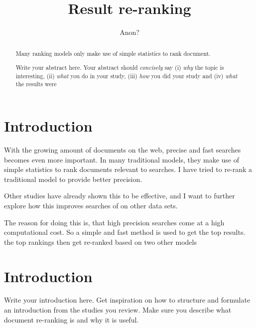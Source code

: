 \documentclass{sig-alternate}
\begin{document}
\title{Result re-ranking}
\author{
\alignauthor 
Anon? %
}
\maketitle

\begin{abstract}
Many ranking models only make use of simple statistics to rank document. 
\end{abstract}
\section{Introduction}
With the growing amount of documents on the web, precise and fast searches becomes even more important. In many traditional models, they make use of simple statistics to rank documents relevant to searches. I have tried to re-rank a traditional model to provide better precision.

Other studies\cite{woo2010achieving} have already shown this to be effective, and I want to further explore how this improves searches of on other data sets.

The reason for doing this is, that high precision searches come at a high computational cost. So a simple and fast method is used to get the top results. the top rankings then get re-ranked based on two other models














\begin{abstract}
Write your abstract here. Your abstract should \emph{concisely} say (i) \emph{why} the topic is interesting, (ii) \emph{what} you do in your study, (iii) \emph{how} you did your study and (iv) \emph{what} the results were
\end{abstract}

\section{Introduction}
Write your introduction here. Get inspiration on how to structure and formulate an introduction from the studies you review. Make sure you describe what document re-ranking is and why it is useful.
\end{document}
